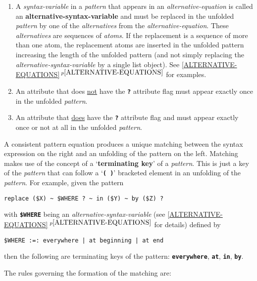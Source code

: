 \documentclass[12pt]{article}
\newcommand{\TT}[1]{{\tt \bfseries #1}}
\newcommand{\key}[1]{{\rm \bfseries #1}}
\newcommand{\itemref}[1]{\ref{#1}$\,^{p\pageref{#1}}$}
\newenvironment{indpar}[1][0.3in]%
	{\begin{list}{}%
		     {\setlength{\itemsep}{0in}%
		      \setlength{\topsep}{0in}%
		      \setlength{\parsep}{1ex}%
		      \setlength{\labelwidth}{#1}%
		      \setlength{\leftmargin}{#1}%
		      \addtolength{\leftmargin}{\labelsep}}%
	 \item}%
	{\end{list}}
\begin{document}
\begin{indpar}
\begin{list}{}{}
\begin{enumerate}
\item A {\em syntax-variable} in a {\em pattern}
that appears in an {\em alternative-equation}
is called an \key{alternative-syntax-variable} and must be replaced
in the unfolded {\em pattern}
by one of the {\em alternatives} from the {\em alternative-equation}.
These {\em alternatives} are sequences of {\em atoms}.
If the replacement is a sequence of more than one atom, the replacement
atoms are inserted in the unfolded pattern increasing the length of
the unfolded pattern (and not simply replacing
the {\em alternative-syntax-variable} by a single list object).
See \itemref{ALTERNATIVE-EQUATIONS} for examples.

\item An attribute that does \underline{not} have the \TT{?} attribute flag
must appear exactly once in the unfolded {\em pattern}.

\item An attribute that \underline{does} have the \TT{?} attribute flag
and must appear exactly once or not at all
in the unfolded {\em pattern}.

\end{enumerate}

\end{list}
\end{indpar}

A consistent pattern equation produces a unique matching between
the syntax expression on the right and an unfolding of the pattern
on the left.  Matching makes use of the concept of a
`\key{terminating key}' of a {\em pattern}.  This is
just a key of the {\em pattern} that can follow a `\TT{(~)}' bracketed
element in an unfolding of the {\em pattern}.  For example, given
the pattern

\begin{center}
\verb/replace ($X) ~ $WHERE ? ~ in ($Y) ~ by ($Z) ?/
\end{center}

with \TT{\$WHERE} being an {\em alternative-syntax-variable}
(see \itemref{ALTERNATIVE-EQUATIONS} for details)
defined by

\begin{center}
\verb/$WHERE :=: everywhere | at beginning | at end/
\end{center}

then the following are terminating keys of the pattern: \TT{everywhere},
\TT{at}, \TT{in}, \TT{by}.



The rules governing the formation of the matching are:
\end{document}
